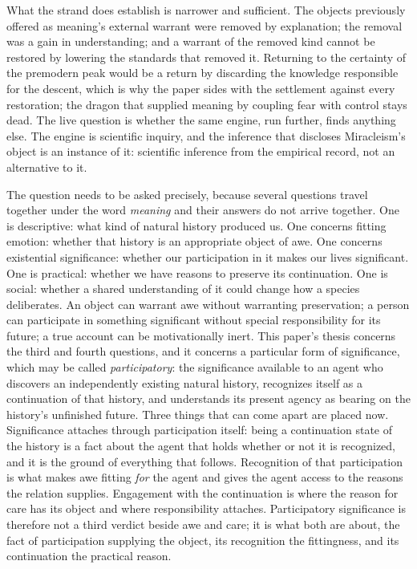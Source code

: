 What the strand does establish is narrower and sufficient. The objects
previously offered as meaning's external warrant were removed by explanation;
the removal was a gain in understanding; and a warrant of the removed kind
cannot be restored by lowering the standards that removed it. Returning to the
certainty of the premodern peak would be a return by discarding the knowledge
responsible for the descent, which is why the paper sides with the settlement
against every restoration; the dragon that supplied meaning by coupling fear
with control stays dead. The live question is whether the same engine, run
further, finds anything else. The engine is scientific inquiry, and the
inference that discloses Miracleism's object is an instance of it:
scientific inference from the empirical record, not an alternative to it.

The question needs to be asked precisely, because several questions travel
together under the word \emph{meaning} and their answers do not arrive
together. One is descriptive: what kind of natural history produced us. One
concerns fitting emotion: whether that history is an appropriate object of
awe. One concerns existential significance: whether our participation in it
makes our lives significant. One is practical: whether we have reasons to
preserve its continuation. One is social: whether a shared understanding of it
could change how a species deliberates. An object can warrant awe without
warranting preservation; a person can participate in something significant
without special responsibility for its future; a true account can be
motivationally inert. This paper's thesis concerns the third and fourth
questions, and it concerns a particular form of significance, which may be
called \emph{participatory}: the significance available to an agent who
discovers an independently existing natural history, recognizes itself as a
continuation of that history, and understands its present agency as bearing on
the history's unfinished future. Three things that can come apart are placed
now. Significance attaches through participation itself: being a
continuation state of the history is a fact about the agent that holds
whether or not it is recognized, and it is the ground of everything that
follows. Recognition of that participation is what makes awe fitting
\emph{for} the agent and gives the agent access to the reasons the relation
supplies. Engagement with the continuation is where the reason for care has
its object and where responsibility attaches. Participatory significance is
therefore not a third verdict beside awe and care; it is what both are about,
the fact of participation supplying the object, its recognition the
fittingness, and its continuation the practical reason.

